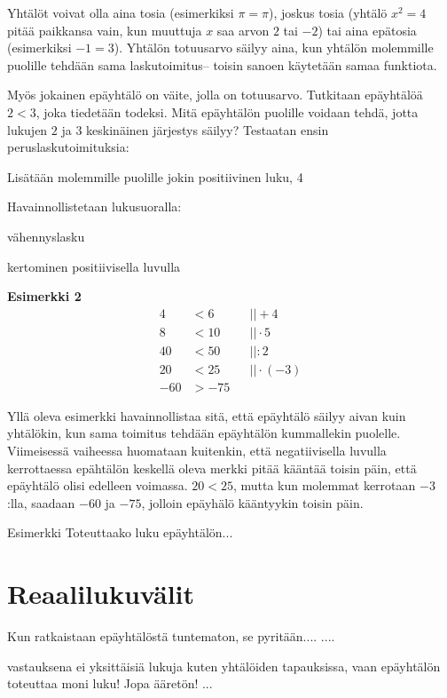 Yhtälöt voivat olla aina tosia (esimerkiksi $\pi=\pi$), joskus tosia (yhtälö $x^2=4$ pitää paikkansa vain, kun muuttuja $x$ saa arvon $2$ tai $-2$) tai aina epätosia (esimerkiksi $-1=3$). Yhtälön totuusarvo säilyy aina, kun yhtälön molemmille puolille tehdään sama laskutoimitus– toisin sanoen käytetään samaa funktiota.

Myös jokainen epäyhtälö on väite, jolla on totuusarvo. Tutkitaan epäyhtälöä $2<3$, joka tiedetään todeksi. Mitä epäyhtälön puolille voidaan tehdä, jotta lukujen $2$ ja $3$ keskinäinen järjestys säilyy? Testaatan ensin peruslaskutoimituksia:

Lisätään molemmille puolille jokin positiivinen luku, 4

Havainnollistetaan lukusuoralla:

vähennyslasku


kertominen positiivisella luvulla


\textbf{Esimerkki 2}
\begin{align*}
4&<6  \ \ \ \ \ &&|| +4 \\
8&<10 &&|| \cdot 5 \\
40&<50 &&|| :2 \\
20&<25 &&|| \cdot (-3) \\
-60&>-75
\end{align*}

Yllä oleva esimerkki havainnollistaa sitä, että epäyhtälö säilyy aivan kuin yhtälökin, kun sama toimitus tehdään
epäyhtälön kummallekin puolelle. Viimeisessä vaiheessa huomataan kuitenkin, että negatiivisella luvulla kerrottaessa
epähtälön keskellä oleva merkki pitää kääntää toisin päin, että epäyhtälö olisi edelleen voimassa. $20<25$, mutta kun molemmat
kerrotaan $-3$:lla, saadaan $-60$ ja $-75$, jolloin epäyhälö kääntyykin toisin päin.

Esimerkki
Toteuttaako luku epäyhtälön...

\section{Reaalilukuvälit}

Kun ratkaistaan epäyhtälöstä tuntematon, se pyritään.... ....

vastauksena ei yksittäisiä lukuja kuten yhtälöiden tapauksissa, vaan epäyhtälön toteuttaa moni luku! Jopa ääretön! ...


